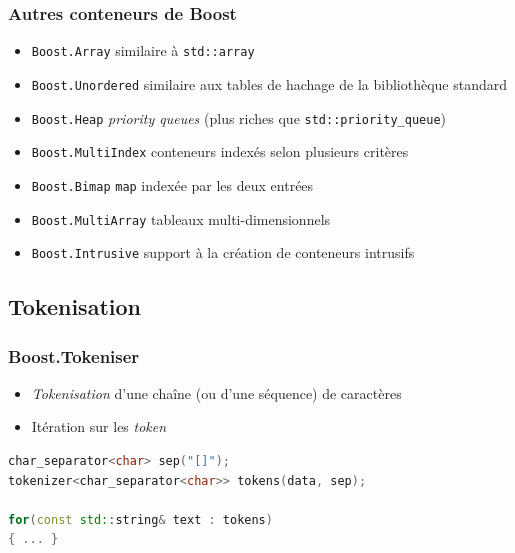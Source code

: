 \documentclass[C++.tex]{subfiles}
\begin{document}
\begin{frame}[fragile]
	\frametitle{Autres conteneurs de Boost}
	\begin{itemize}
		\item \lstinline|Boost.Array| similaire à \lstinline|std::array|
		\item \lstinline|Boost.Unordered| similaire aux tables de hachage de la bibliothèque standard


		\item \lstinline|Boost.Heap| \textit{priority queues} (plus riches que \lstinline|std::priority_queue|)
		\item \lstinline|Boost.MultiIndex| conteneurs indexés selon plusieurs critères
		\item \lstinline|Boost.Bimap| \lstinline|map| indexée par les deux entrées
		\item \lstinline|Boost.MultiArray| tableaux multi-dimensionnels
		\item \lstinline|Boost.Intrusive| support à la création de conteneurs intrusifs

	\end{itemize}
\end{frame}

\subsection*{Tokenisation}
\begin{frame}[fragile]
	\frametitle{Boost.Tokeniser}
	\begin{itemize}
		\item \textit{Tokenisation} d'une chaîne (ou d'une séquence) de caractères
		\item Itération sur les \textit{token}
	\end{itemize}


	\begin{lstlisting}[language=C++]
char_separator<char> sep("[]");
tokenizer<char_separator<char>> tokens(data, sep);

for(const std::string& text : tokens)
{ ... }\end{lstlisting}
\end{frame}
\end{document}
